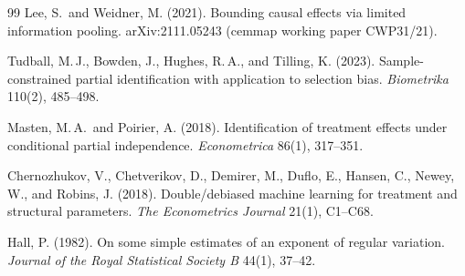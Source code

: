 \documentclass[11pt]{article}
\theoremstyle{definition}
\theoremstyle{plain}
\theoremstyle{remark}
\begin{document}
\begin{thebibliography}{99}
Lee, S.\ and Weidner, M. (2021). Bounding causal effects via limited information pooling. arXiv:2111.05243 (cemmap working paper CWP31/21).

Tudball, M.\,J., Bowden, J., Hughes, R.\,A., and Tilling, K. (2023). Sample-constrained partial identification with application to selection bias. \emph{Biometrika} 110(2), 485--498.

Masten, M.\,A.\ and Poirier, A. (2018). Identification of treatment effects under conditional partial independence. \emph{Econometrica} 86(1), 317--351.

Chernozhukov, V., Chetverikov, D., Demirer, M., Duflo, E., Hansen, C., Newey, W., and Robins, J. (2018). Double/debiased machine learning for treatment and structural parameters. \emph{The Econometrics Journal} 21(1), C1--C68.

Hall, P. (1982). On some simple estimates of an exponent of regular variation. \emph{Journal of the Royal Statistical Society B} 44(1), 37--42.

\end{thebibliography}
\end{document}
